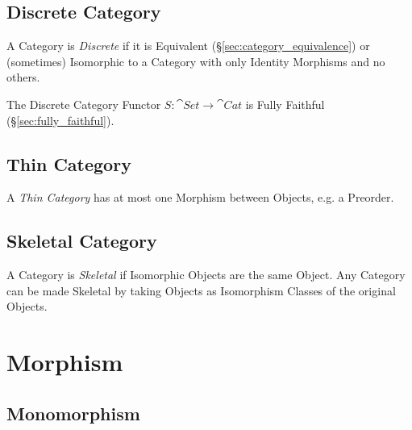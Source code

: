 \subsection{Discrete Category}\label{sec:discrete_category}

A Category is \emph{Discrete} if it is Equivalent
(\S\ref{sec:category_equivalence}) or (sometimes) Isomorphic to a
Category with only Identity Morphisms and no others.

The Discrete Category Functor $S : \cat{Set} \rightarrow
\cat{Cat}$ is Fully Faithful (\S\ref{sec:fully_faithful}).



\subsection{Thin Category}\label{sec:thin_category}

A \emph{Thin Category} has at most one Morphism between Objects, e.g.
a Preorder.



\subsection{Skeletal Category}\label{sec:skeletal_category}

A Category is \emph{Skeletal} if Isomorphic Objects are the same
Object. Any Category can be made Skeletal by taking Objects as
Isomorphism Classes of the original Objects.



\section{Morphism}\label{sec:morphism}

\subsection{Monomorphism}\label{sec:monomorphism}

